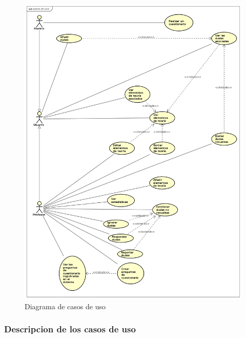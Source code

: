 \documentclass[openright,twoside,10pt]{book}
\begin{document}
    \begin{figure}[H]
        \begin{center}
            \includegraphics[scale=0.35]{img/astah/analisis/casos_de_uso/useCase00.png}
        \end{center}
        \caption{Diagrama de casos de uso}
    \end{figure}
    
    \newpage
    
    \subsubsection{Descripcion de los casos de
    uso}\label{descripcion-de-los-casos-de-uso}
    
    \vspace*{\fill}
    
\end{document}

